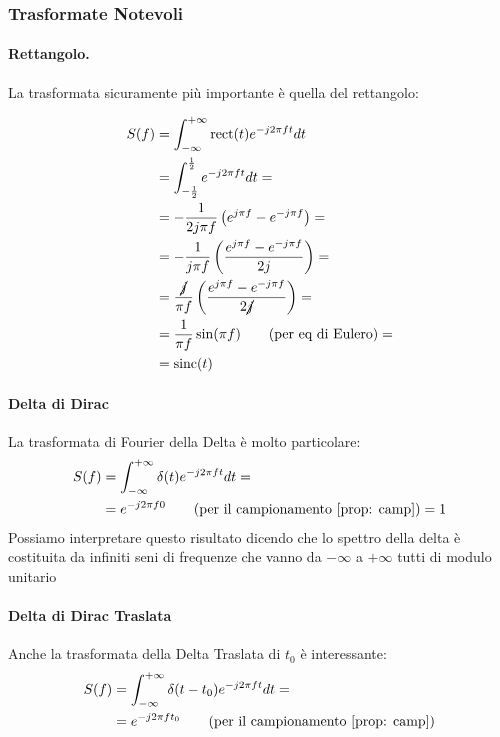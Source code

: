 \subsubsection{Trasformate Notevoli}
\newcommand{\fCouple}{\overset{\fourier}{\longleftrightarrow}}
\newcommand{\fAnticouple}{\overset{\fourier^{-1}}{\longleftrightarrow}}
\paragraph{Rettangolo.} La trasformata sicuramente più importante è quella del rettangolo:

\begin{align*}
    S(f) &= \int_{-\infty}^{+\infty} \text{rect}(t)e^{-j2\pi ft} dt \\
         &= \int_{-\frac{1}{2}}^{\frac{1}{2}} e^{-j2\pi ft}dt =\\
         &= -\frac{1}{2j \pi f}\left(e^{j\pi f} - e^{-j\pi f}\right) = \\
         &= -\frac{1}{j \pi f}\left( \frac{e^{j\pi f} - e^{-j\pi f}}{2j}\right) = \\
         &= \frac{\cancel{j}}{ \pi f}\left( \frac{e^{j\pi f} - e^{-j\pi f}}{2\cancel{j}}\right) = \\
         &= \frac{1}{\pi f} \sin(\pi f) \tag{per eq di Eulero} =\\
         &= \text{sinc}(t)
\end{align*}

\paragraph{Delta di Dirac}
La trasformata di Fourier della Delta è molto particolare:
\begin{align*}
    S(f) &= \int_{-\infty}^{+\infty} \delta(t) e^{-j2\pi ft}dt =\\
         &= e^{-j2\pi f0} \tag{per il campionamento \eqref{prop: camp}} = 1\\
\end{align*}
Possiamo interpretare questo risultato dicendo che lo spettro della delta è costituita da infiniti seni di frequenze che 
vanno da $-\infty$ a $+\infty$ tutti di modulo unitario
\paragraph{Delta di Dirac Traslata}
Anche la trasformata della Delta Traslata di $t_0$ è interessante:
\begin{align*}
    S(f) &= \int_{-\infty}^{+\infty} \delta(t - t_0) e^{-j2\pi ft}dt =\\
         &= e^{-j2\pi f t_0} \tag{per il campionamento \eqref{prop: camp}}
\end{align*}

